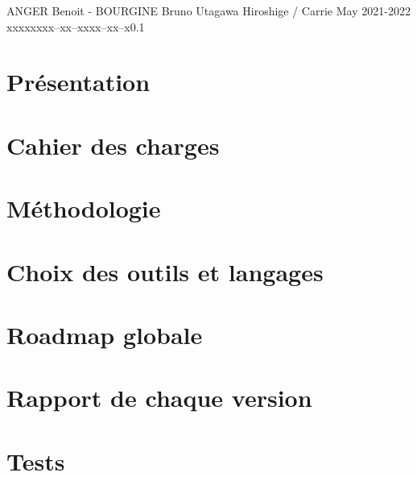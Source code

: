 \documentclass{tstextbook}
\begin{document}
       {ANGER Benoit - BOURGINE Bruno}
       {Utagawa Hiroshige / Carrie May}
       {2021-2022}
       {xxxxx}{xxx--xx--xxxx--xx--x}{0.1}
       {}
       {}



\chapter{Présentation}


\chapter{Cahier des charges}


\chapter{Méthodologie}


\chapter{Choix des outils et langages}


% 

\chapter{Roadmap globale}


\chapter{Rapport de chaque version}


% 

% 

\chapter{Tests}


\end{document}
